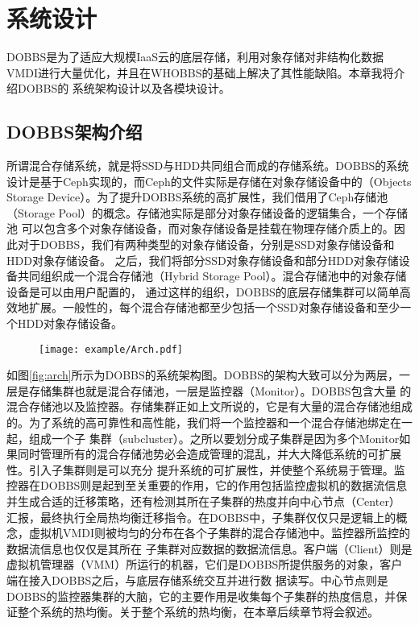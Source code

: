 
\chapter{系统设计}
\label{chap:systemdesign}
DOBBS是为了适应大规模IaaS云的底层存储，利用对象存储对非结构化数据VMDI进行大量优化，并且在WHOBBS的基础上解决了其性能缺陷。本章我将介绍DOBBS的
系统架构设计以及各模块设计。

\section{DOBBS架构介绍}
所谓混合存储系统，就是将SSD与HDD共同组合而成的存储系统。DOBBS的系统设计是基于Ceph实现的，而Ceph的文件实际是存储在对象存储设备中的（Objects 
Storage Device）。为了提升DOBBS系统的高扩展性，我们借用了Ceph存储池（Storage Pool）的概念。存储池实际是部分对象存储设备的逻辑集合，一个存储池
可以包含多个对象存储设备，而对象存储设备是挂载在物理存储介质上的。因此对于DOBBS，我们有两种类型的对象存储设备，分别是SSD对象存储设备和HDD对象存储设备。
之后，我们将部分SSD对象存储设备和部分HDD对象存储设备共同组织成一个混合存储池（Hybrid Storage Pool）。混合存储池中的对象存储设备是可以由用户配置的，
通过这样的组织，DOBBS的底层存储集群可以简单高效地扩展。一般性的，每个混合存储池都至少包括一个SSD对象存储设备和至少一个HDD对象存储设备。

\begin{figure}[!htp]
    \centering
    \texttt{[image: example/Arch.pdf]}
   \end{figure}

如图\ref{fig:arch}所示为DOBBS的系统架构图。DOBBS的架构大致可以分为两层，一层是存储集群也就是混合存储池，一层是监控器（Monitor）。DOBBS包含大量
的混合存储池以及监控器。存储集群正如上文所说的，它是有大量的混合存储池组成的。为了系统的高可靠性和高性能，我们将一个监控器和一个混合存储池绑定在一起，组成一个子
集群（subcluster）。之所以要划分成子集群是因为多个Monitor如果同时管理所有的混合存储池势必会造成管理的混乱，并大大降低系统的可扩展性。引入子集群则是可以充分
提升系统的可扩展性，并使整个系统易于管理。监控器在DOBBS则是起到至关重要的作用，它的作用包括监控虚拟机的数据流信息并生成合适的迁移策略，还有检测其所在子集群的热度并向中心节点（Center）
汇报，最终执行全局热均衡迁移指令。在DOBBS中，子集群仅仅只是逻辑上的概念，虚拟机VMDI则被均匀的分布在各个子集群的混合存储池中。监控器所监控的数据流信息也仅仅是其所在
子集群对应数据的数据流信息。客户端（Client）则是虚拟机管理器（VMM）所运行的机器，它们是DOBBS所提供服务的对象，客户端在接入DOBBS之后，与底层存储系统交互并进行数
据读写。中心节点则是DOBBS的监控器集群的大脑，它的主要作用是收集每个子集群的热度信息，并保证整个系统的热均衡。关于整个系统的热均衡，在本章后续章节将会叙述。

